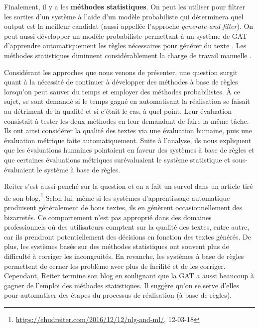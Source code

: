 Finalement, il y a les \textbf{méthodes statistiques}. On peut les utiliser pour filtrer les sorties d'un système à l'aide d'un modèle probabiliste qui déterminera quel output est la meilleur candidat \citep{LangkildeForestbasedStatisticalSentence2000} (aussi appellée l'approche \emph{generate-and-filter}). On peut aussi développer un modèle probabiliste permettant à un système de \ac{GAT} d'apprendre automatiquement les règles nécessaires pour générer du texte \citep{WhiteMinimalDependencyLength2012}. Les méthodes statistiques diminuent considérablement la charge de travail manuelle \citep{LangkildeForestbasedStatisticalSentence2000}.

Considérant les approches que nous venons de présenter, une question surgit quant à la nécessité de continuer à développer des méthodes à base de règles lorsqu'on peut sauver du temps et employer des méthodes probabilistes. À ce sujet, \cite{BelzSystemBuildingCost2009} se sont demandé si le temps gagné en automatisant la réalisation se faisait au détriment de la qualité et si c'était le cas, à quel point. Leur évaluation consistait à tester les deux méthodes en leur demandant de faire la même tâche. Ils ont ainsi considérer la qualité des textes via une évaluation humaine, puis une évaluation métrique faite automatiquement. Suite à l'analyse, ils nous expliquent que les évaluations humaines pointaient en faveur des systèmes à base de règles et que certaines évaluations métriques surévaluaient le système statistique et sous-évaluaient le système à base de règles.

Reiter s'est aussi penché sur la question et en a fait un survol dans un article tiré de son blog.\footnote{\url{https://ehudreiter.com/2016/12/12/nlg-and-ml/}, 12-03-18} Selon lui, même si les systèmes d'apprentissage automatique produisent généralement de bons textes, ils en génèrent occasionnellement des bizarretés. Ce comportement n'est pas approprié dans des domaines professionnels où des utilisateurs comptent sur la qualité des textes, entre autre, car ils prendront potentiellement des décisions en fonction des textes générés. De plus, les systèmes basés sur des méthodes statistiques ont souvent plus de difficulté à corriger les incongruités. En revanche, les systèmes à base de règles permettent de cerner les problème avec plus de facilité et de les corriger. Cependant, Reiter termine son blog en soulignant que la \ac{GAT} a aussi beaucoup à gagner de l'emploi des méthodes statistiques. Il suggère qu'on se serve d'elles pour automatiser des étapes du processus de réalisation (à base de règles).

